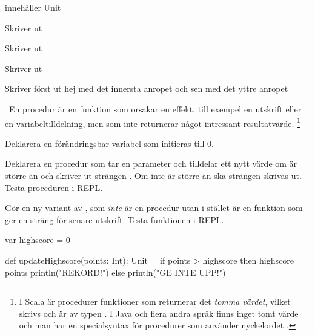 \SubtaskSolved {}

\SubtaskSolved

  innehåller Unit

 Skriver ut 

 Skriver ut 

 Skriver ut 

 Skriver först ut hej med det innersta anropet och sen \code{()} med det yttre anropet

\SubtaskSolved  {}

\SubtaskSolved  {}

\QUESTEND




\QUESTBEGIN

\Task \what~En procedur är en funktion som orsakar en effekt, till exempel en utskrift eller en variabeltilldelning, men som inte returnerar något intressant resultatvärde.%
\footnote{I Scala är procedurer funktioner som returnerar det \emph{tomma värdet}, vilket skrivs \code{()} och är av typen . I Java och flera andra språk finns inget tomt värde och man har en specialsyntax för procedurer som använder nyckelordet . }

\Subtask Deklarera en förändringsbar variabel  som initieras till 0.

\Subtask Deklarera en procedur  som tar en parameter  och tilldelar  ett nytt värde om  är större än  och skriver ut strängen . Om inte  är större än  ska strängen  skrivas ut. Testa proceduren i REPL.

\Subtask Gör en ny variant av , som \emph{inte} är en procedur utan i stället är en funktion som ger en sträng för senare utskrift. Testa funktionen i REPL.

\SOLUTION

\TaskSolved \what

\SubtaskSolved
\begin{Code}
var highscore = 0
\end{Code}

\SubtaskSolved
\begin{Code}
def updateHighscore(points: Int): Unit =
  if points > highscore then
    highscore = points
    println("REKORD!")
  else println("GE INTE UPP!")
\end{Code}

